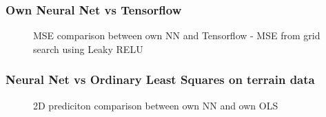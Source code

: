\documentclass
[twocolumn,
secnumarabic,
nobibnotes,
aps,
prl,
reprint,
groupedaddress,
amsmath,
amssymb
]{revtex4-2}
\begin{document}
\subsubsection{Own Neural Net vs Tensorflow}
\begin{figure}
  \hspace*{-1.5cm}
  \caption{MSE comparison between own NN and Tensorflow - MSE from grid search using Leaky RELU\label{fig:own_NN_vs_tf}}
\end{figure}


\subsubsection{Neural Net vs Ordinary Least Squares on terrain data}

\begin{figure}[htb]
  \caption{2D prediciton comparison between own NN and own OLS \label{fig:2D_preds_NN_vs_OLS}}
\end{figure}
\end{document}
